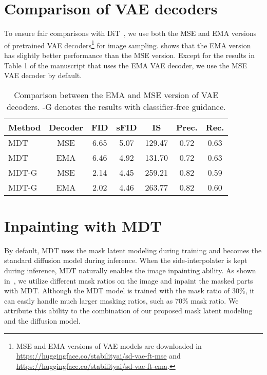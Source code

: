 \documentclass[final]{cvpr}
\begin{document}
\section{Comparison of VAE decoders}
To ensure fair comparisons with DiT~\cite{peebles2022scalable}, we use both the MSE and EMA versions
of pretrained VAE decoders\footnote{MSE and EMA versions of VAE models are downloaded in \url{https://huggingface.co/stabilityai/sd-vae-ft-mse}
and \url{https://huggingface.co/stabilityai/sd-vae-ft-ema}.} for image sampling.
 shows that
the EMA version has slightly better performance than the MSE version.
Except for the results in Table 1 of the manuscript that uses the EMA VAE decoder,
we use the MSE VAE decoder by default.
\begin{table}[h]
  \centering
  \setlength{\tabcolsep}{1.7mm} \small
  \begin{tabular}{lcccccc}
      \toprule
      Method	& Decoder &  FID & sFID & IS & Prec. & Rec. \\	\midrule
      MDT & MSE  & 6.65  & 5.07 & 129.47 & 0.72 & 0.63 \\
      MDT & EMA  & 6.46  & 4.92 & 131.70 & 0.72 & 0.63 \\
      \midrule
      MDT-G & MSE  & 2.14  & 4.45 & 259.21 & 0.82 & 0.59 \\ 
      MDT-G & EMA  & 2.02  & 4.46 & 263.77 & 0.82 & 0.60 \\ 
      \bottomrule
  \end{tabular}
  \vspace{2pt}
  \caption{Comparison between the EMA and MSE version of VAE decoders.
  -G denotes the results with classifier-free guidance.}
  \label{tab:emavsmse}
  \end{table}

\section{Inpainting with MDT}
By default, MDT uses the mask latent modeling during training
and becomes the standard diffusion model during inference.
When the side-interpolater 
is kept during inference,
MDT naturally enables the image inpainting ability.
As shown in~, 
we utilize different mask ratios on the image and inpaint
the masked parts with MDT.
Although the MDT model is trained with the mask ratio of 30\%,
it can easily handle much larger masking ratios, such as 70\% mask ratio.
We attribute this ability to the combination of our proposed mask latent modeling
and the diffusion model.
\end{document}
